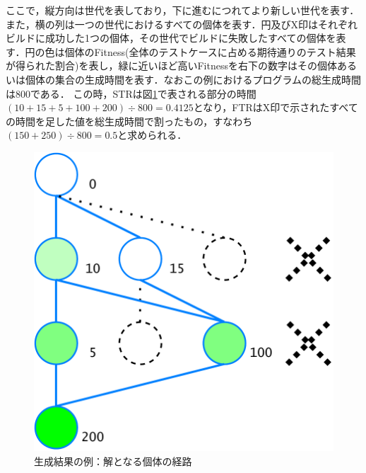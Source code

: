 \documentclass[uplatex,dvipdfmx,a4paper]{jsarticle}
\begin{document}
ここで，縦方向は世代を表しており，下に進むにつれてより新しい世代を表す．また，横の列は一つの世代におけるすべての個体を表す．円及びX印はそれぞれビルドに成功した1つの個体，その世代でビルドに失敗したすべての個体を表す．円の色は個体のFitness(全体のテストケースに占める期待通りのテスト結果が得られた割合)を表し，緑に近いほど高いFitnessを右下の数字はその個体あるいは個体の集合の生成時間を表す．なおこの例におけるプログラムの総生成時間は800である．
この時，STRは図\ref{fig:example_STR}で表される部分の時間$(10 + 15 + 5 + 100 + 200) \div 800 = 0.4125$となり，FTRはX印で示されたすべての時間を足した値を総生成時間で割ったもの，すなわち$(150 + 250) \div 800 = 0.5$と求められる．
\begin{figure}[t]
  \centering
  \includegraphics[width=\linewidth]{fig/astSample_STR.pdf}
  \caption{生成結果の例：解となる個体の経路}
  \label{fig:example_STR}
\end{figure}
\end{document}
